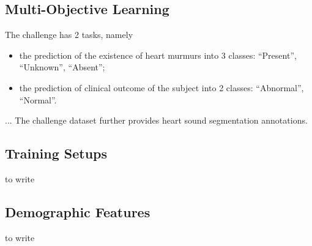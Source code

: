 \subsection{Multi-Objective Learning}
\label{subsec:mol}

The challenge has 2 tasks, namely
\begin{itemize}
    \item the prediction of the existence of heart murmurs into 3 classes: ``Present'', ``Unknown'', ``Absent'';
    \item the prediction of clinical outcome of the subject into 2 classes: ``Abnormal'', ``Normal''.
\end{itemize}

... The challenge dataset \cite{Oliveira_2021_CirCor} further provides heart sound segmentation annotations.

\cite{Caruana_1997_mtl}

\subsection{Training Setups}
\label{subsec:training}

to write


\subsection{Demographic Features}
\label{subsec:demo_feat}

to write
